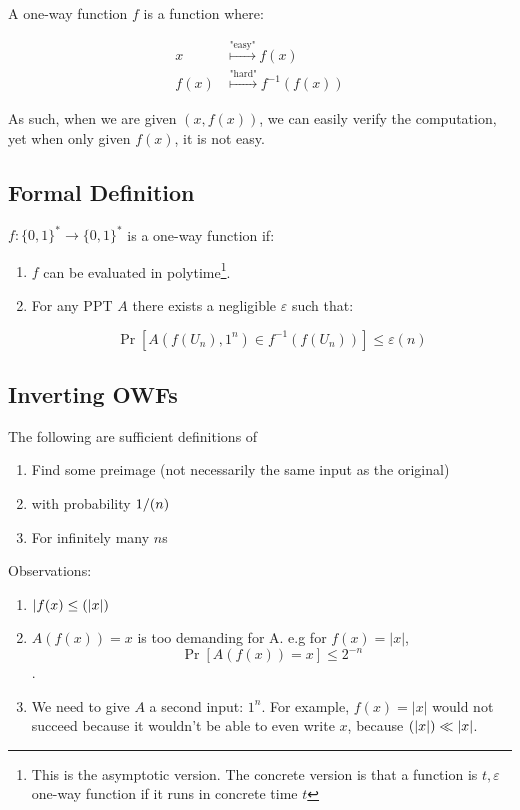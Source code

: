 \documentclass{idc_msc}
\let\polynomial\relax
\DeclareMathOperator*{\polynomial}{\mathrm{poly}}
\begin{document}
A one-way function \(f\) is a function where:

\[
\begin{aligned}
  x &\overset{\text{"easy"}}{\longmapsto} f(x) \\
  f(x) &\overset{\text{"hard"}}{\longmapsto} f^{-1}(f(x))
\end{aligned}
\]

As such, when we are given \((x, f(x))\), we can easily verify the computation, yet when only given \(f(x)\), it is not easy.

\subsection{Formal Definition}

\(f: \{0, 1\}^* \to \{0, 1\}^*\) is a one-way function if:

\begin{enumerate}
  \item \(f\) can be evaluated in polytime\footnote{This is the asymptotic version. The concrete version is that a function is \(t, \varepsilon\) one-way function if it runs in concrete time \(t\)}.
  \item For any PPT \(A\) there exists a negligible \(\varepsilon\) such that:

  \[
    \Pr[A(f(U_n), 1^n) \in f^{-1}(f(U_n))] \le \varepsilon(n)
  \]
\end{enumerate}


\subsection{Inverting OWFs}

The following are sufficient definitions of 

\begin{enumerate}
  \item Find some preimage (not necessarily the same input as the original)
  \item with probability \(1 / \polynomial(n)\)
  \item For infinitely many \(n\)s
\end{enumerate}

Observations:

\begin{enumerate}
  \item \(|f(x) \le \polynomial(|x|)\)
  \item \(A(f(x)) = x\) is too demanding for A. e.g for \(f(x) = |x|\), \[\Pr[A(f(x)) = x] \le 2^{-n}\].
  \item We need to give \(A\) a second input: \(1^n\). For example, \(f(x) = |x|\) would not succeed because it wouldn't be able to even write \(x\), because \(\polynomial(|x|) \ll |x|\).
\end{enumerate}
\end{document}
